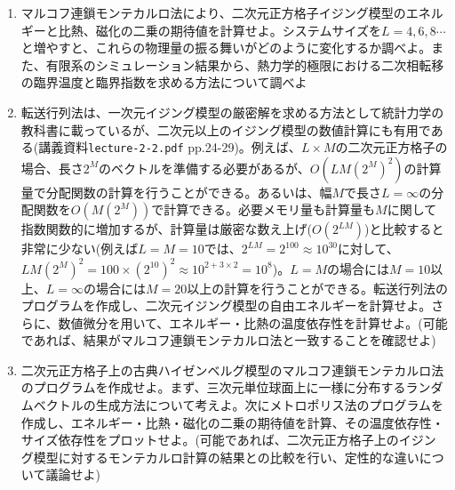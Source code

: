 \documentclass[11pt]{jarticle}
\begin{document}
\begin{enumerate}
\item マルコフ連鎖モンテカルロ法により、二次元正方格子イジング模型のエネルギーと比熱、磁化の二乗の期待値を計算せよ。システムサイズを$L=4, 6,8\cdots$と増やすと、これらの物理量の振る舞いがどのように変化するか調べよ。また、有限系のシミュレーション結果から、熱力学的極限における二次相転移の臨界温度と臨界指数を求める方法について調べよ



\item 転送行列法は、一次元イジング模型の厳密解を求める方法として統計力学の教科書に載っているが、二次元以上のイジング模型の数値計算にも有用である(講義資料{\tt lecture-2-2.pdf} pp.24-29)。例えば、$L\times M$の二次元正方格子の場合、長さ$2^M$のベクトルを準備する必要があるが、$O(LM(2^M)^2)$の計算量で分配関数の計算を行うことができる。あるいは、幅$M$で長さ$L=\infty$の分配関数を$O(M(2^M))$で計算できる。必要メモリ量も計算量も$M$に関して指数関数的に増加するが、計算量は厳密な数え上げ($O(2^{LM})$)と比較すると非常に少ない(例えば$L=M=10$では、$2^{LM}=2^{100}\approx 10^{30}$に対して、$LM(2^M)^2=100 \times (2^{10})^2 \approx 10^{2+3\times2} = 10^{8}$)。$L=M$の場合には$M=10$以上、$L=\infty$の場合には$M=20$以上の計算を行うことができる。転送行列法のプログラムを作成し、二次元イジング模型の自由エネルギーを計算せよ。さらに、数値微分を用いて、エネルギー・比熱の温度依存性を計算せよ。(可能であれば、結果がマルコフ連鎖モンテカルロ法と一致することを確認せよ)

\item 二次元正方格子上の古典ハイゼンベルグ模型のマルコフ連鎖モンテカルロ法のプログラムを作成せよ。まず、三次元単位球面上に一様に分布するランダムベクトルの生成方法について考えよ。次にメトロポリス法のプログラムを作成し、エネルギー・比熱・磁化の二乗の期待値を計算、その温度依存性・サイズ依存性をプロットせよ。(可能であれば、二次元正方格子上のイジング模型に対するモンテカルロ計算の結果との比較を行い、定性的な違いについて議論せよ)


\end{enumerate}
\end{document}
